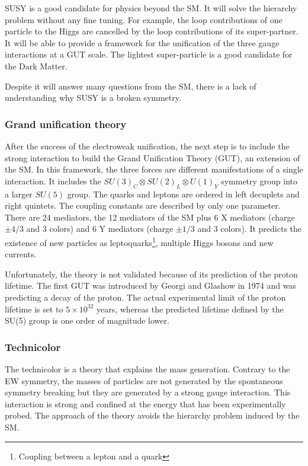       SUSY is a good candidate for physics beyond the \gls{SM}. 
      It will solve the hierarchy problem without any fine tuning.
      For example, the loop contributions of one particle to the Higgs are cancelled by the loop contributions of its super-partner.
      It will be able to provide a framework for the unification of the three gauge interactions at a GUT scale.
      The lightest super-particle is a good candidate for the Dark Matter.

      Despite it will answer many questions from the \gls{SM}, there is a lack of understanding why SUSY is a broken symmetry.
      
      \subsubsection{Grand unification theory}
      
      After the success of the electroweak unification, the next step is to include the strong interaction to build the Grand Unification Theory (GUT), an extension of the \gls{SM}.
      In this framework, the three forces are different manifestations of a single interaction. 
      It includes the $SU(3)_C \otimes SU(2)_L \otimes U(1)_Y$ symmetry group into a larger $SU(5)$ group. 
      The quarks and leptons are ordered in left decuplets and right quintets.
      The coupling constants are described by only one parameter.  
      There are 24 mediators, the 12 mediators of the \gls{SM} plus 6 X mediators (charge $\pm4/3$ and 3 colors) and 6 Y mediators (charge $\pm1/3$ and 3 colors).
      It predicts the existence of new particles as leptoquarks\footnote{Coupling between a lepton and a quark}, multiple Higgs bosons and new currents.

      Unfortunately, the theory is not validated because of its prediction of the proton lifetime. 
      The first GUT was introduced by Georgi and Glashow in 1974 and was predicting a decay of the proton. 
      The actual experimental limit of the proton lifetime is set to $5 \times 10^{32}$ years, whereas the predicted lifetime defined by the SU(5) group is one order of magnitude lower.
      \cite{Agashe:2014kda}

      \subsubsection{Technicolor}

      The technicolor is a theory that explains the mass generation.
      Contrary to the EW symmetry, the masses of particles are not generated by the spontaneous symmetry breaking but they are generated by a strong gauge interaction.
      This interaction is strong and confined at the energy that has been experimentally probed.
      The approach of the theory avoids the hierarchy problem induced by the \gls{SM}.
      
